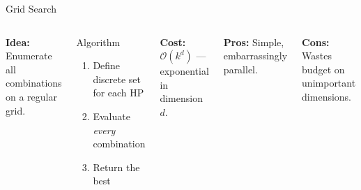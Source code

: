 \documentclass[aspectratio=169,11pt]{beamer}
\newcommand{\emphc}[1]{\textcolor{harvardcrimson}{#1}}
\begin{document}
\begin{frame}{Grid Search}
\begin{columns}[T]
\textbf{Idea:} Enumerate all combinations on a regular grid.

\vspace{0.3cm}
\begin{block}{Algorithm}
\begin{enumerate}
    \item Define discrete set for each HP
    \item Evaluate \emph{every} combination
    \item Return the best
\end{enumerate}
\end{block}

\vspace{0.2cm}
\textbf{Cost:} $\mathcal{O}(k^d)$ --- exponential in dimension $d$.

\vspace{0.2cm}
\textbf{Pros:} Simple, embarrassingly parallel.

\textbf{Cons:} Wastes budget on \emphc{unimportant} dimensions.

\begin{center}
\end{center}
\end{columns}
\end{frame}
\end{document}
